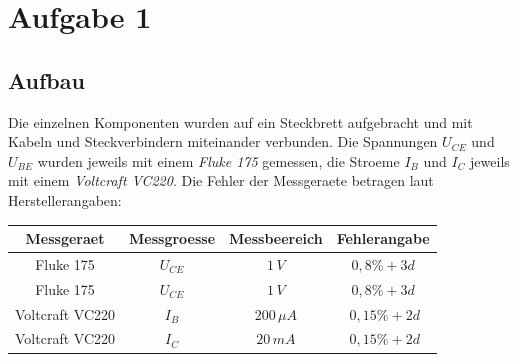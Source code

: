 \newpage
\section{Aufgabe 1}
\subsection{Aufbau}
Die einzelnen Komponenten wurden auf ein Steckbrett aufgebracht und mit Kabeln und Steckverbindern miteinander verbunden. Die Spannungen \(U_{CE}\) und \(U_{BE}\) wurden jeweils mit einem  {\it Fluke 175} gemessen, die Stroeme \(I_B\) und \(I_C\) jeweils mit einem  {\it Voltcraft VC220}. Die Fehler der Messgeraete betragen laut Herstellerangaben:
\begin{center}
\begin{tabular}{c|c|c|c}
Messgeraet & Messgroesse & Messbeereich & Fehlerangabe\\\hline
Fluke 175 & \(U_{CE}\) & \(1\, V\) & \(0,8\% +3d\) \\
Fluke 175 & \(U_{CE}\) & \(1\, V\) & \(0,8\% +3d\) \\
Voltcraft VC220 & \(I_{B}\) & \(200 \, \mu A \) & \(\ 0,15\% +2d\) \\
Voltcraft VC220 & \(I_{C}\) & \(20 \, mA \) & \(\ 0,15\% +2d\)
\end{tabular}
\end{center}
\begin{center}


\vspace{0.5cm}


\vspace{0.5cm}


\vspace{0.5cm}


\vspace{0.5cm}

\begin{minipage}{\linewidth}
\centering
{}
%
\label{gnuplot_kennlinienfeld}
\end{minipage}
\end{center}